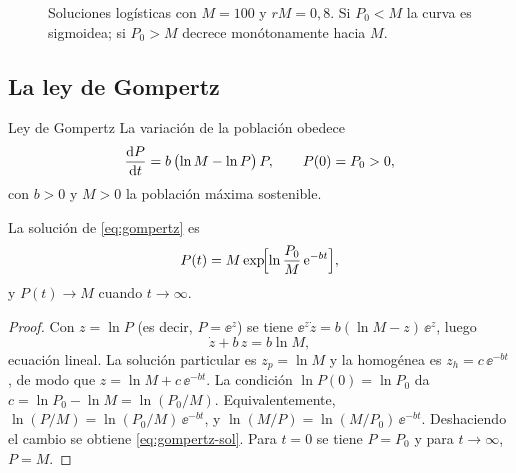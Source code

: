 \begin{figure}[H]
  \centering
  \caption{Soluciones logísticas con $M=100$ y $rM=0{,}8$. Si $P_0<M$ la curva es sigmoidea; si $P_0>M$ decrece monótonamente hacia $M$.}
  \label{fig:logistica}
\end{figure}

\subsection{La ley de Gompertz}

\begin{definicion}{Ley de Gompertz}
La variación de la población obedece
\begin{equation}
  \dfrac{\mathrm{d} P}{\mathrm{d} t} = b\,\bigl(\ln M-\ln P\bigr)\,P, \qquad P(0)=P_0>0,
  \label{eq:gompertz}
\end{equation}
con $b>0$ y $M>0$ la población máxima sostenible.
\end{definicion}

\begin{proposition}\label{prop:gompertz}
La solución de \eqref{eq:gompertz} es
\begin{equation}
  P(t) = M\exp\!\Bigl[\ln\frac{P_0}{M}\,\mathrm{e}^{-bt}\Bigr],
  \label{eq:gompertz-sol}
\end{equation}
y $P(t)\to M$ cuando $t\to\infty$.
\end{proposition}

\begin{proof}
Con $z=\ln P$ (es decir, $P=\ee^{z}$) se tiene $\ee^{z}\dot z = b(\ln M - z)\,\ee^{z}$, luego
\[
  \dot z + b\,z = b\ln M,
\]
ecuación lineal. La solución particular es $z_p=\ln M$ y la homogénea es $z_h=c\,\ee^{-bt}$, de modo que $z=\ln M + c\,\ee^{-bt}$. La condición $\ln P(0)=\ln P_0$ da $c=\ln P_0-\ln M=\ln(P_0/M)$. Equivalentemente,
$\ln(P/M)=\ln(P_0/M)\,\ee^{-bt}$, y $\ln(M/P)=\ln(M/P_0)\,\ee^{-bt}$. Deshaciendo el cambio se obtiene \eqref{eq:gompertz-sol}. Para $t=0$ se tiene $P=P_0$ y para $t\to\infty$, $P=M$.
\end{proof}

